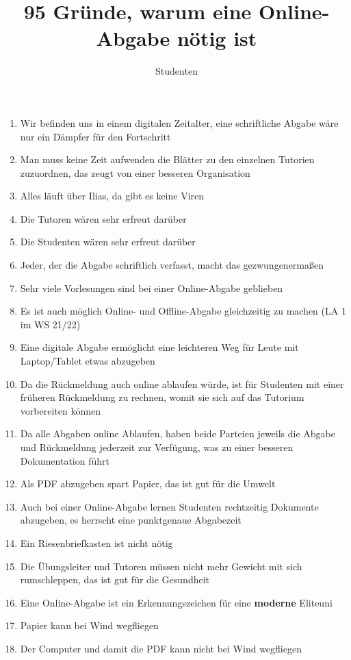 \documentclass[a4paper]{article}
\title{95 Gründe, warum eine Online-Abgabe nötig ist}
\author{Studenten}
\begin{document}
\maketitle

\begin{enumerate}

	\item Wir befinden uns in einem digitalen Zeitalter, eine schriftliche Abgabe wäre nur ein Dämpfer für den Fortschritt
	\item Man muss keine Zeit aufwenden die Blätter zu den einzelnen Tutorien zuzuordnen, das zeugt von einer besseren Organisation
	\item Alles läuft über Ilias, da gibt es keine Viren
	\item Die Tutoren wären sehr erfreut darüber
	\item Die Studenten wären sehr erfreut darüber
	\item Jeder, der die Abgabe schriftlich verfasst, macht das gezwungenermaßen
	\item Sehr viele Vorlesungen sind bei einer Online-Abgabe geblieben
	\item Es ist auch möglich Online- und Offline-Abgabe gleichzeitig zu machen (LA 1 im WS 21/22)
	\item Eine digitale Abgabe ermöglicht eine leichteren Weg für Leute mit Laptop/Tablet etwas abzugeben
	\item Da die Rückmeldung auch online ablaufen würde, ist für Studenten mit einer früheren Rückmeldung zu rechnen, womit sie sich auf das Tutorium vorbereiten können
	\item Da alle Abgaben online Ablaufen, haben beide Parteien jeweils die Abgabe und Rückmeldung jederzeit zur Verfügung, was zu einer besseren Dokumentation führt
	\item Als PDF abzugeben spart Papier, das ist gut für die Umwelt
	\item Auch bei einer Online-Abgabe lernen Studenten rechtzeitig Dokumente abzugeben, es herrscht eine punktgenaue Abgabezeit
	\item Ein Riesenbriefkasten ist nicht nötig
	\item Die Übungsleiter und Tutoren müssen nicht mehr Gewicht mit sich rumschleppen, das ist gut für die Gesundheit
	\item Eine Online-Abgabe ist ein Erkennungszeichen für eine \textbf{moderne} Eliteuni
	\item Papier kann bei Wind wegfliegen
	\item Der Computer und damit die PDF kann nicht bei Wind wegfliegen
\end{enumerate}
\end{document}

